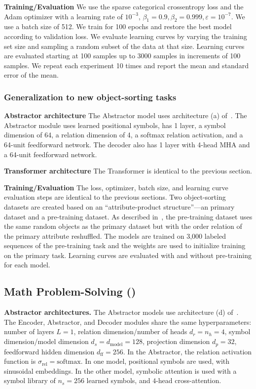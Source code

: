 \textbf{Training/Evaluation} We use the sparse categorical crossentropy loss and the Adam optimizer with a learning rate of $10^{-3}$, $\beta_1 = 0.9, \beta_2 = 0.999, \varepsilon = 10^{-7}$. We use a batch size of 512. We train for 100 epochs and restore the best model according to validation loss. We evaluate learning curves by varying the training set size and sampling a random subset of the data at that size. Learning curves are evaluated starting at 100 samples up to 3000 samples in increments of 100 samples. We repeat each experiment 10 times and report the mean and standard error of the mean.

\subsubsection{Generalization to new object-sorting tasks}

\textbf{Abstractor architecture} The Abstractor model uses architecture (a) of~. The Abstractor module uses learned positional symbols, has 1 layer, a symbol dimension of 64, a relation dimension of 4, a softmax relation activation, and a 64-unit feedforward network.  The decoder also has 1 layer with 4-head MHA and a 64-unit feedforward network.

\textbf{Transformer architecture} The Transformer is identical to the previous section.

\textbf{Training/Evaluation} The loss, optimizer, batch size, and learning curve evaluation steps are identical to the previous sections. Two object-sorting datasets are created based on an ``attribute-product structure''---an primary dataset and a pre-training dataset. As described in~, the pre-training dataset uses the same random objects as the primary dataset but with the order relation of the primary attribute reshuffled. The models are trained on 3,000 labeled sequences of the pre-training task and the weights are used to initialize training on the primary task. Learning curves are evaluated with and without pre-training for each model.

\subsection{Math Problem-Solving ()}

\textbf{Abstractor architectures.} The Abstractor models use architecture (d) of~. The Encoder, Abstractor, and Decoder modules share the same hyperparameters: number of layers $L = 1$, relation dimension/number of heads $d_r = n_h = 4$, symbol dimension/model dimension $d_s = d_{\mathrm{model}} = 128$, projection dimension $d_p = 32$, feedforward hidden dimension $d_{\mathrm{ff}} = 256$. In the Abstractor, the relation activation function is $\sigma_{\mathrm{rel}} = \mathrm{softmax}$. In one model, positional symbols are used, with sinusoidal embeddings. In the other model, symbolic attention is used with a symbol library of $n_s = 256$ learned symbols, and $4$-head cross-attention.

